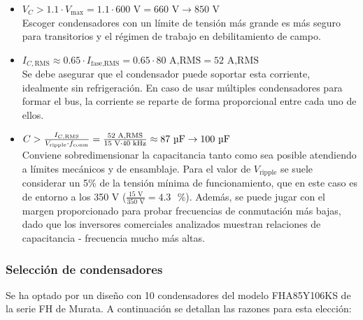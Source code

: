 \begin{itemize}
	\item $ V_C > 1.1 \cdot V_{\text{max}} = 1.1 \cdot 600 \text{ V} = 660 \text{ V} \rightarrow 850 \text{ V} $ \\
		Escoger condensadores con un límite de tensión más grande es más seguro para transitorios y el régimen de trabajo en debilitamiento de campo.
	\item $ I_{C,\text{RMS}} \approx 0.65 \cdot I_{\text{fase,RMS}} = 0.65 \cdot 80 \text{ A,RMS} = 52 \text{ A,RMS}$ \\
		Se debe asegurar que el condensador puede soportar esta corriente, idealmente sin refrigeración. En caso de usar múltiples condensadores para formar el bus, la corriente se reparte de forma proporcional entre cada uno de ellos.
	\item $ C > \frac{I_{C,\text{RMS}}}{V_{\text{ripple}} \cdot f_{\text{conm}}} = \frac{52 \text{ A,RMS}}{15 \text{ V} \cdot 40 \text{ kHz}} \approx 87 \text{ }\text{\unit{\micro\farad}} \rightarrow 100 \text{ }\text{\unit{\micro\farad}} $ \\
		Conviene sobredimensionar la capacitancia tanto como sea posible atendiendo a límites mecánicos y de ensamblaje. Para el valor de $V_{\text{ripple}}$ se suele considerar un 5\% de la tensión mínima de funcionamiento, que en este caso es de entorno a los 350 V ($\frac{15 \text{ V}}{350 \text{ V}} = 4.3\text{ }\%$). Además, se puede jugar con el margen proporcionado para probar frecuencias de conmutación más bajas, dado que los inversores comerciales analizados muestran relaciones de capacitancia - frecuencia mucho más altas.
\end{itemize}

\subsubsection{Selección de condensadores}

Se ha optado por un diseño con 10 condensadores del modelo FHA85Y106KS de la serie FH de Murata. A continuación se detallan las razones para esta elección:

